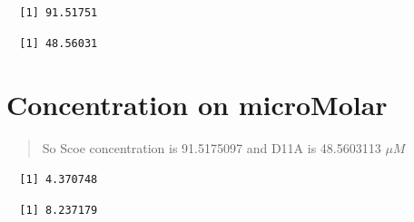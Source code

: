 \documentclass[12pt,twoside]{reedthesis}
\begin{document}
  \begin{verbatim}
  [1] 91.51751
  \end{verbatim}
  
  \begin{Shaded}
  \begin{Highlighting}[]
  \end{Highlighting}
  \end{Shaded}
  
  \begin{verbatim}
  [1] 48.56031
  \end{verbatim}
  
  \section{Concentration on microMolar}\label{concentration-on-micromolar}
  
  \begin{quote}
  So Scoe concentration is 91.5175097 and D11A is 48.5603113 \(\mu M\)
  \end{quote}
  
  \begin{Shaded}
  \begin{Highlighting}[]
  
  \StringTok{ }\NormalTok{*}
  \NormalTok{(}
  \end{Highlighting}
  \end{Shaded}
  
  \begin{verbatim}
  [1] 4.370748
  \end{verbatim}
  
  \begin{Shaded}
  \begin{Highlighting}[]
  \NormalTok{(}
  \end{Highlighting}
  \end{Shaded}
  
  \begin{verbatim}
  [1] 8.237179
  \end{verbatim}
  
\end{document}
